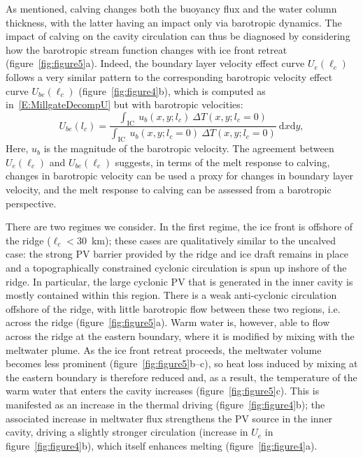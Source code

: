 \documentclass[draft]{agujournal2019}
\begin{document}
As mentioned, calving changes both the buoyancy flux and the water column thickness, with the latter having an impact only via barotropic dynamics. The impact of calving on the cavity circulation can thus be diagnosed by considering how the barotropic stream function changes with ice front retreat (figure~\ref{fig:figure5}a). Indeed, the boundary layer velocity  effect curve $U_e(\ell_c)$ follows a very similar pattern to the corresponding barotropic velocity effect curve $U_{be}(\ell_c)$ (figure~\ref{fig:figure4}b), which is computed as in~\eqref{E:MillgateDecompU} but with barotropic velocities:
\begin{equation}\label{E:MillgateDecompUbaro}
    U_{be}(l_c)  =  \frac{\int_{\text{IC}}~u_b(x,y; l_c)~\Delta T(x,y;l_c = 0)}{\int_{\text{IC}}~ u_b(x,y; l_c = 0)~\Delta T(x,y;l_c = 0)}~\mathrm{d}x\mathrm{d}y,
\end{equation}
Here, $u_b$ is the magnitude of the barotropic velocity. The agreement between $U_e(\ell_c)$ and $U_{be}(\ell_c)$ suggests, in terms of the melt response to calving, changes in barotropic velocity can be used a proxy for changes in boundary layer velocity, and the melt response to calving can be assessed from a barotropic perspective. %

There are two regimes we consider. In the first regime, the ice front is offshore of the ridge ($\ell_c < 30$~km); these cases are qualitatively similar to the uncalved case: the strong PV barrier provided by the ridge and ice draft remains in place and a topographically constrained cyclonic circulation is spun up inshore of the ridge. In particular, the large cyclonic PV that is generated in the inner cavity is mostly contained within this region. There is a weak anti-cyclonic circulation offshore of the ridge, with little barotropic flow between these two regions, i.e. across the ridge (figure~\ref{fig:figure5}a). Warm water is, however, able to flow across the ridge at the eastern boundary, where it is modified by mixing with the meltwater plume. As the ice front retreat proceeds, the meltwater volume becomes less prominent (figure~\ref{fig:figure5}b--c), so heat loss induced by mixing at the eastern boundary is therefore reduced and, as a result, the temperature of the warm water that enters the cavity increases (figure~\ref{fig:figure5}c). This is manifested as an increase in the thermal driving (figure~\ref{fig:figure4}b); the associated increase in meltwater flux strengthens the PV source in the inner cavity, driving a slightly stronger circulation (increase in $U_e$ in figure~\ref{fig:figure4}b), which itself enhances melting (figure~\ref{fig:figure4}a).
\end{document}
